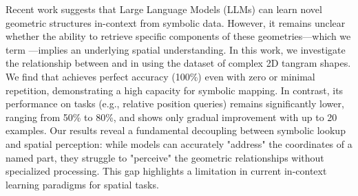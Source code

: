 Recent work suggests that Large Language Models (LLMs) can learn novel geometric structures in-context from symbolic data. However, it remains unclear whether the ability to retrieve specific components of these geometries—which we term \addressing—implies an underlying spatial understanding. In this work, we investigate the relationship between \addressing and \reasoning in \gpt using the \kilogram dataset of complex 2D tangram shapes. We find that \gpt achieves perfect \addressing accuracy (100\%) even with zero or minimal repetition, demonstrating a high capacity for symbolic mapping. In contrast, its performance on \reasoning tasks (e.g., relative position queries) remains significantly lower, ranging from 50\% to 80\%, and shows only gradual improvement with up to 20 examples. Our results reveal a fundamental decoupling between symbolic lookup and spatial perception: while models can accurately "address" the coordinates of a named part, they struggle to "perceive" the geometric relationships without specialized processing. This gap highlights a limitation in current in-context learning paradigms for spatial tasks.
